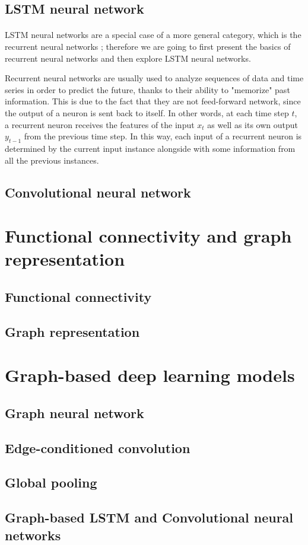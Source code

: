 \subsection{LSTM neural network}
\paragraph{} LSTM neural networks are a special case of a more general category, which is the recurrent neural networks \cite{OReilly:handsonML}; therefore we are going to first present the basics of recurrent neural networks and then explore LSTM neural networks.

Recurrent neural networks are usually used to analyze sequences of data and time series in order to predict the future, thanks to their ability to "memorize" past information. This is due to the fact that they are not feed-forward network, since the output of a neuron is sent back to itself. In other words, at each time step $t$, a recurrent neuron receives the features of the input $x_t$ as well as its own output $y_{t-1}$ from the previous time step. In this way, each input of a recurrent neuron is determined by the current input instance alongside with some information from all the previous instances.

\subsection{Convolutional neural network}

\section{Functional connectivity and graph representation}
\subsection{Functional connectivity}
\subsection{Graph representation}

\section{Graph-based deep learning models}
\subsection{Graph neural network}
\subsection{Edge-conditioned convolution}
\subsection{Global pooling}
\subsection{Graph-based LSTM and Convolutional neural networks}